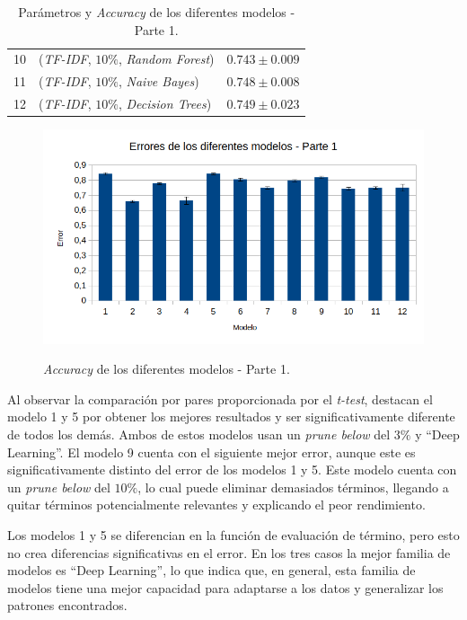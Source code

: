 \documentclass[es]{uc3mreport}
\begin{document}
\begin{report}
\begin{table}[H]
\begin{center}
\begin{tabular}{ @{}clc@{} }
                10 & (\textit{TF-IDF}, $10\%$,               \textit{Random Forest})  & $0.743 \pm 0.009$ \\
                11 & (\textit{TF-IDF}, $10\%$,               \textit{Naive Bayes})    & $0.748 \pm 0.008$ \\
                12 & (\textit{TF-IDF}, $10\%$,               \textit{Decision Trees}) & $0.749 \pm 0.023$ \\
                \bottomrule
            \end{tabular}
            \caption{Parámetros y \textit{Accuracy} de los diferentes modelos -
            Parte 1.}
        \end{center}
    \end{table}

    \begin{figure}[H]
        \center
        \includegraphics[width=0.85\linewidth]{errors_train1.png}\\
        \caption{\textit{Accuracy} de los diferentes modelos - Parte 1.}
    \end{figure}

    Al observar la comparación por pares proporcionada por el \textit{t-test},
    destacan el modelo 1 y 5 por obtener los mejores resultados y ser significativamente
    diferente de todos los demás. Ambos de estos modelos usan un \textit{prune below}
    del $3\%$ y ``Deep Learning''. El modelo 9 cuenta con el siguiente mejor error,
    aunque este es significativamente distinto del error de los modelos 1 y 5. Este
    modelo cuenta con un \textit{prune below} del $10\%$, lo cual puede eliminar
    demasiados términos, llegando a quitar términos potencialmente relevantes y
    explicando el peor rendimiento.

    Los modelos 1 y 5 se diferencian en la función de evaluación de término, pero
    esto no crea diferencias significativas en el error. En los tres casos la mejor
    familia de modelos es ``Deep Learning'', lo que indica que, en general, esta
    familia de modelos tiene una mejor capacidad para adaptarse a los datos y
    generalizar los patrones encontrados.


\end{report}
\end{document}
